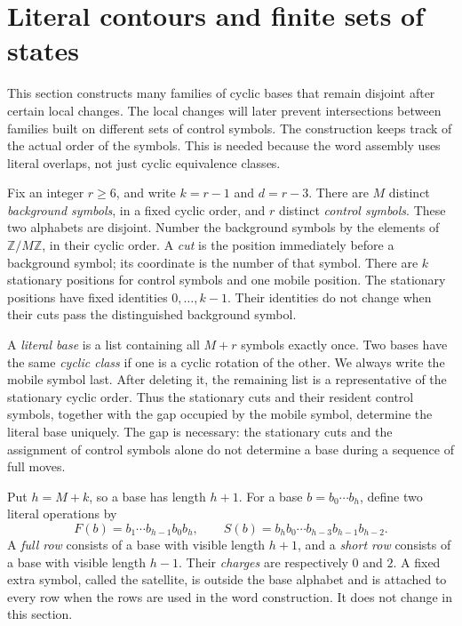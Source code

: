 \section{Literal contours and finite sets of states}
\label{geo:section}

This section constructs many families of cyclic bases that remain disjoint
after certain local changes. The local changes will later prevent
intersections between families built on different sets of control symbols.
The construction keeps track of the actual order of the symbols. This is
needed because the word assembly uses literal overlaps, not just cyclic
equivalence classes.

Fix an integer $r\geq 6$, and write $k=r-1$ and $d=r-3$. There are $M$
distinct \emph{background symbols}, in a fixed cyclic order, and $r$
distinct \emph{control symbols}. These two alphabets are disjoint. Number
the background symbols by the elements of $\mathbb Z/M\mathbb Z$, in their
cyclic order. A \emph{cut} is the position immediately before a background
symbol; its coordinate is the number of that symbol. There are $k$
stationary positions for control symbols and one mobile position. The
stationary positions have fixed identities $0,\ldots,k-1$. Their identities
do not change when their cuts pass the distinguished background symbol.

A \emph{literal base} is a list containing all $M+r$ symbols exactly once.
Two bases have the same \emph{cyclic class} if one is a cyclic rotation of
the other. We always write the mobile symbol last. After deleting it, the
remaining list is a representative of the stationary cyclic order. Thus
the stationary cuts and their resident control symbols, together with the
gap occupied by the mobile symbol, determine the literal base uniquely.
The gap is necessary: the stationary cuts and the assignment of control
symbols alone do not determine a base during a sequence of full moves.

Put $h=M+k$, so a base has length $h+1$. For a base
$b=b_0\cdots b_h$, define two literal operations by
\[
 F(b)=b_1\cdots b_{h-1}b_0b_h,
 \qquad
 S(b)=b_hb_0\cdots b_{h-3}b_{h-1}b_{h-2}.
\]
A \emph{full row} consists of a base with visible length $h+1$, and a
\emph{short row} consists of a base with visible length $h-1$. Their
\emph{charges} are respectively $0$ and $2$. A fixed extra symbol, called
the satellite, is outside the base alphabet and is attached to every row
when the rows are used in the word construction. It does not change in
this section.

